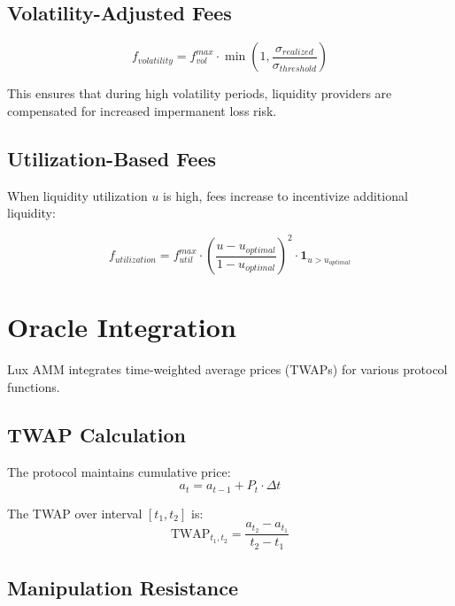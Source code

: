 \documentclass[11pt,a4paper]{article}
\begin{document}
\subsection{Volatility-Adjusted Fees}

\begin{equation}
    f_{volatility} = f_{vol}^{max} \cdot \min\left(1, \frac{\sigma_{realized}}{\sigma_{threshold}}\right)
\end{equation}

This ensures that during high volatility periods, liquidity providers are compensated for increased impermanent loss risk.

\subsection{Utilization-Based Fees}

When liquidity utilization $u$ is high, fees increase to incentivize additional liquidity:

\begin{equation}
    f_{utilization} = f_{util}^{max} \cdot \left(\frac{u - u_{optimal}}{1 - u_{optimal}}\right)^2 \cdot \mathbf{1}_{u > u_{optimal}}
\end{equation}

\section{Oracle Integration}

Lux AMM integrates time-weighted average prices (TWAPs) for various protocol functions.

\subsection{TWAP Calculation}

The protocol maintains cumulative price:
\begin{equation}
    a_t = a_{t-1} + P_t \cdot \Delta t
\end{equation}

The TWAP over interval $[t_1, t_2]$ is:
\begin{equation}
    \text{TWAP}_{t_1, t_2} = \frac{a_{t_2} - a_{t_1}}{t_2 - t_1}
\end{equation}

\subsection{Manipulation Resistance}
\end{document}

